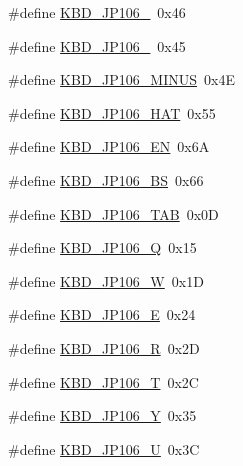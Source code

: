 \begin{DoxyCompactItemize}
\item 
\#define \hyperlink{kbd__jp106_8h_add4b8e18822978c11b4a9078347a8d82_add4b8e18822978c11b4a9078347a8d82}{K\+B\+D\+\_\+\+J\+P106\+\_}~0x46
\item 
\#define \hyperlink{kbd__jp106_8h_a29f26512f74ec8959eb41501aa48cbfe_a29f26512f74ec8959eb41501aa48cbfe}{K\+B\+D\+\_\+\+J\+P106\+\_}~0x45
\item 
\#define \hyperlink{kbd__jp106_8h_a7a9ec63d3d845ce8d3f134f3d3c519ea_a7a9ec63d3d845ce8d3f134f3d3c519ea}{K\+B\+D\+\_\+\+J\+P106\+\_\+\+M\+I\+N\+U\+S}~0x4\+E
\item 
\#define \hyperlink{kbd__jp106_8h_a5c64630f94c12d90493ec61817e2d268_a5c64630f94c12d90493ec61817e2d268}{K\+B\+D\+\_\+\+J\+P106\+\_\+\+H\+A\+T}~0x55
\item 
\#define \hyperlink{kbd__jp106_8h_a07064cf3cd955dca1c8e433127269507_a07064cf3cd955dca1c8e433127269507}{K\+B\+D\+\_\+\+J\+P106\+\_\+\+E\+N}~0x6\+A
\item 
\#define \hyperlink{kbd__jp106_8h_a934d0b662801f06d567dd97d60345c1b_a934d0b662801f06d567dd97d60345c1b}{K\+B\+D\+\_\+\+J\+P106\+\_\+\+B\+S}~0x66
\item 
\#define \hyperlink{kbd__jp106_8h_a7b1c6af6d0bc59d5f5fe2fbc7e5cc47d_a7b1c6af6d0bc59d5f5fe2fbc7e5cc47d}{K\+B\+D\+\_\+\+J\+P106\+\_\+\+T\+A\+B}~0x0\+D
\item 
\#define \hyperlink{kbd__jp106_8h_a6ddac9f757f187d45626571f90c4a14b_a6ddac9f757f187d45626571f90c4a14b}{K\+B\+D\+\_\+\+J\+P106\+\_\+\+Q}~0x15
\item 
\#define \hyperlink{kbd__jp106_8h_aaa7eac4f8119acc19bc894345f7cc5cd_aaa7eac4f8119acc19bc894345f7cc5cd}{K\+B\+D\+\_\+\+J\+P106\+\_\+\+W}~0x1\+D
\item 
\#define \hyperlink{kbd__jp106_8h_a37ebe8d851c5e8ad4fe63b108f26964a_a37ebe8d851c5e8ad4fe63b108f26964a}{K\+B\+D\+\_\+\+J\+P106\+\_\+\+E}~0x24
\item 
\#define \hyperlink{kbd__jp106_8h_a9b8c2c8429ce475ea04fb0bd83b644fc_a9b8c2c8429ce475ea04fb0bd83b644fc}{K\+B\+D\+\_\+\+J\+P106\+\_\+\+R}~0x2\+D
\item 
\#define \hyperlink{kbd__jp106_8h_a848f5cdf556cbc20e67d89059e80e9ca_a848f5cdf556cbc20e67d89059e80e9ca}{K\+B\+D\+\_\+\+J\+P106\+\_\+\+T}~0x2\+C
\item 
\#define \hyperlink{kbd__jp106_8h_a13a0e937ec75ad6a819785482e982169_a13a0e937ec75ad6a819785482e982169}{K\+B\+D\+\_\+\+J\+P106\+\_\+\+Y}~0x35
\item 
\#define \hyperlink{kbd__jp106_8h_ac9facdb5398627cade8ade7a179d98dd_ac9facdb5398627cade8ade7a179d98dd}{K\+B\+D\+\_\+\+J\+P106\+\_\+\+U}~0x3\+C

\end{DoxyCompactItemize}
